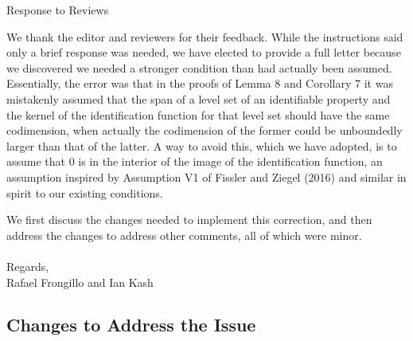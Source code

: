 \documentclass[a4paper]{article}
\begin{document}
\begin{center}
{\Large Response to Reviews}
\end{center}

We thank the editor and reviewers for their feedback.  While the instructions said only a brief response was needed, we have elected to provide a full letter because we discovered we needed a stronger condition than had actually been assumed.  Essentially, the error was that in the proofs of Lemma 8 and Corollary 7 it was mistakenly assumed that the span of a level set of an identifiable property and the kernel of the identification function for that level set should have the same codimension, when actually the codimension of the former could be unboundedly larger than that of the latter.  A way to avoid this, which we have adopted, is to assume that 0 is in the interior of the image of the identification function, an assumption inspired by Assumption V1 of Fissler and Ziegel (2016) and similar in spirit to our existing conditions.

We first discuss the changes needed to implement this correction, and then address the changes to address other comments, all of which were minor.\\
\\
Regards,\\
Rafael Frongillo and Ian Kash

\subsection*{Changes to Address the Issue}
\end{document}

